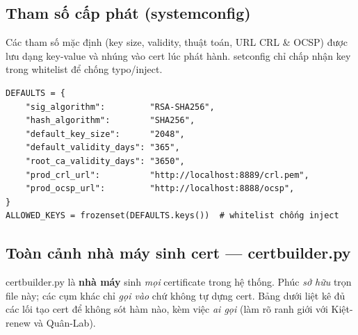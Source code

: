 \documentclass[12pt,a4paper]{article}
\newcommand{\code}[1]{{\ttfamily\small\def\_{\textunderscore\discretionary{}{}{}}#1}}
\begin{document}
\subsection{Tham số cấp phát (\code{system\_config})}

Các tham số mặc định (key size, validity, thuật toán, URL CRL \& OCSP) được lưu
dạng key-value và nhúng vào cert lúc phát hành. \code{set\_config} chỉ chấp nhận
key trong whitelist để chống typo/inject.

\begin{Verbatim}
DEFAULTS = {
    "sig_algorithm":         "RSA-SHA256",
    "hash_algorithm":        "SHA256",
    "default_key_size":      "2048",
    "default_validity_days": "365",
    "root_ca_validity_days": "3650",
    "prod_crl_url":          "http://localhost:8889/crl.pem",
    "prod_ocsp_url":         "http://localhost:8888/ocsp",
}
ALLOWED_KEYS = frozenset(DEFAULTS.keys())  # whitelist chống inject
\end{Verbatim}

\subsection{Toàn cảnh nhà máy sinh cert --- \code{cert\_builder.py}}

\begin{notebox}
\code{cert\_builder.py} là \textbf{nhà máy} sinh \emph{mọi} certificate trong hệ
thống. Phúc \emph{sở hữu} trọn file này; các cụm khác chỉ \emph{gọi vào} chứ
không tự dựng cert. Bảng dưới liệt kê đủ các lối tạo cert để không sót hàm nào,
kèm việc \emph{ai gọi} (làm rõ ranh giới với Kiệt-renew và Quân-Lab).
\end{notebox}
\end{document}
